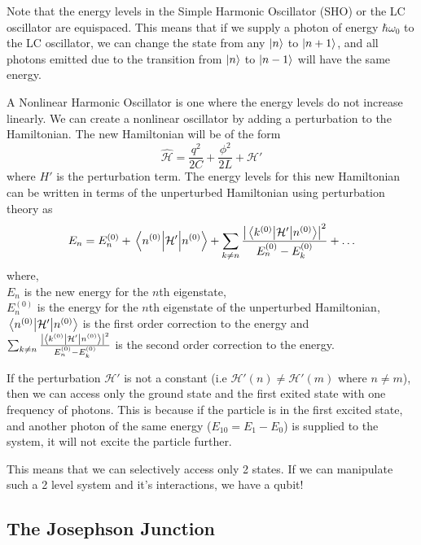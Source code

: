 Note that the energy levels in the Simple Harmonic Oscillator (SHO) or the LC oscillator are equispaced. This means that if we supply a photon of energy $\hbar\omega_0$ to the LC oscillator, we can change the state from any $\ket{n}$ to $\ket{n+1}$, and all photons emitted due to the transition from $\ket{n}$ to $\ket{n-1}$ will have the same energy.

A Nonlinear Harmonic Oscillator is one where the energy levels do not increase linearly. We can create a nonlinear oscillator by adding a perturbation to the Hamiltonian. The new Hamiltonian will be of the form
\begin{equation}
\hat{\mathcal{H}}=\frac{q^2}{2C}+\frac{\phi^2}{2L} +\mathcal{H}'
\end{equation}
where $H'$ is the perturbation term.
The energy levels for this new Hamiltonian can be written in terms of the unperturbed Hamiltonian using perturbation theory as
\begin{equation}
E_n=E_n^{(0)}+\expval{\mathcal{H}'}{n^{(0)}}+\sum_{k\neq n}\frac{\left|\mel{k^{(0)}}{\mathcal{H}'}{n^{(0)}}\right|^2}{E_n^{(0)}-E_k^{(0)}}+\ldots
\end{equation}
where,\\
$E_n$ is the new energy for the $n$th eigenstate,\\
$E_n^{(0)}$ is the energy for the $n$th eigenstate of the unperturbed Hamiltonian,\\
$\expval{\mathcal{H}'}{n^{(0)}}$ is the first order correction to the energy and\\
$\sum_{k\neq n}\frac{\left|\mel{k^{(0)}}{\mathcal{H}'}{n^{(0)}}\right|^2}{E_n^{(0)}-E_k^{(0)}}$ is the second order correction to the energy.

If the perturbation $\mathcal{H}'$ is not a constant (i.e $\mathcal{H}'(n)\neq \mathcal{H}'(m)$ where $n\neq m$), then we can access only the ground state and the first exited state with one frequency of photons. This is because if the particle is in the first excited state, and another photon of the same energy ($E_{10}=E_1-E_0$) is supplied to the system, it will not excite the particle further.

This means that we can selectively access only 2 states. If we can manipulate such a 2 level system and it's interactions, we have a qubit!

\subsection{The Josephson Junction}

